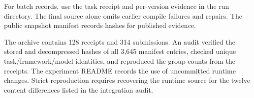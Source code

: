 For batch records, use the task receipt and per-version evidence in the run directory. The final source alone omits earlier compile failures and repairs. The public snapshot manifest records hashes for published evidence.

The archive contains 128 receipts and 314 submissions. An audit verified the stored and decompressed hashes of all 3,645 manifest entries, checked unique task/framework/model identities, and reproduced the group counts from the receipts. The experiment README records the use of uncommitted runtime changes. Strict reproduction requires recovering the runtime source for the twelve content differences listed in the integration audit.
